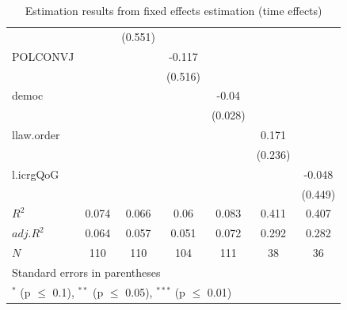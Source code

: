 \documentclass{article}\usepackage{graphicx, color}
\begin{document}
\begin{table}
\begin{tabular}{l*{6}{c}}
  		& 		&(0.551) 		& 		& 		& 		& \\
POLCONVJ 		& 		& 		&-0.117 		& 		& 		& \\
  		& 		& 		&(0.516) 		& 		& 		& \\
democ 		& 		& 		& 		&-0.04 		& 		& \\
  		& 		& 		& 		&(0.028) 		& 		& \\
llaw.order 		& 		& 		& 		& 		&0.171 		& \\
  		& 		& 		& 		& 		&(0.236) 		& \\
l.icrgQoG 		& 		& 		& 		& 		& 		&-0.048 \\
  		& 		& 		& 		& 		& 		&(0.449) \\
\hline
$R^2$ 		&0.074 		&0.066 		&0.06 		&0.083 		&0.411 		&0.407 \\
$adj.R^2$ 		&0.064 		&0.057 		&0.051 		&0.072 		&0.292 		&0.282 \\
$N$ 		&\multicolumn{1}{c}{110} 		&\multicolumn{1}{c}{110} 		&\multicolumn{1}{c}{104} 		&\multicolumn{1}{c}{111} 		&\multicolumn{1}{c}{38} 		&\multicolumn{1}{c}{36} \\
\hline\hline
\multicolumn{7}{l}{\footnotesize Standard errors in parentheses}\\
\multicolumn{7}{l}{\footnotesize $^{*}$ (p $\le$ 0.1), $^{**}$ (p $\le$ 0.05), $^{***}$ (p $\le$ 0.01)}\\
\end{tabular}
\caption{Estimation results from fixed effects estimation (time effects)}
\label{tab:fe5}
\end{table}
\def\sym#1{\ifmmode^{#1}\else\(^{#1}\)\fi}
\end{document}
